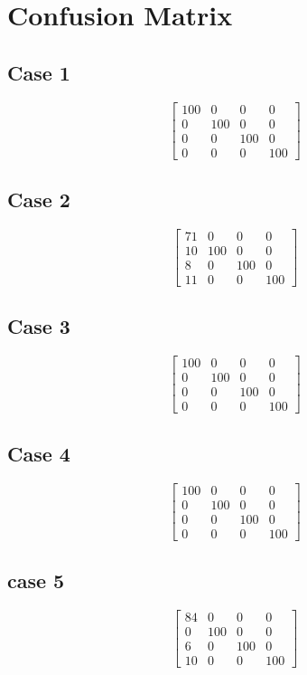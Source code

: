 \documentclass[11pt,a4paper]{article}
\begin{document}
\section{Confusion Matrix}

\subsection{Case 1}
$$
\begin{bmatrix}
100   &  0 &    0 &    0 \\
0  & 100   &  0   &  0 \\
0   &  0 &  100  &   0 \\
0   &  0 &    0 &  100
\end{bmatrix}
$$

\subsection{Case 2}
$$
\begin{bmatrix}
71   &  0 &    0 &    0 \\
10  & 100   &  0   &  0 \\
8   &  0 &  100  &   0 \\
11   &  0 &    0 &  100
\end{bmatrix}
$$

\subsection{Case 3}
$$
\begin{bmatrix}
100   &  0 &    0 &    0 \\
0  & 100   &  0   &  0 \\
0   &  0 &  100  &   0 \\
0   &  0 &    0 &  100
\end{bmatrix}
$$
\subsection{Case 4}
$$
\begin{bmatrix}
100   &  0 &    0 &    0 \\
0  & 100   &  0   &  0 \\
0   &  0 &  100  &   0 \\
0   &  0 &    0 &  100
\end{bmatrix}
$$

\subsection{case 5}
$$
\begin{bmatrix}
84   &  0 &    0 &    0 \\
0  & 100   &  0   &  0 \\
6   &  0 &  100  &   0 \\
10   &  0 &    0 &  100
\end{bmatrix}
$$
\end{document}
